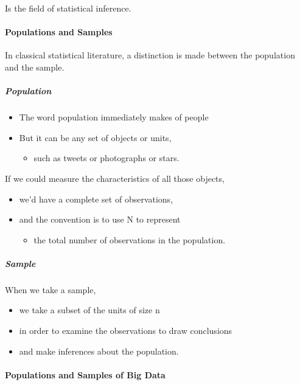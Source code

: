 \documentclass[]{article}
\providecommand{\tightlist}{%
  \setlength{\itemsep}{0pt}\setlength{\parskip}{0pt}}
\let\oldparagraph\paragraph
\renewcommand{\paragraph}[1]{\oldparagraph{#1}\mbox{}}
\let\oldsubparagraph\subparagraph
\renewcommand{\subparagraph}[1]{\oldsubparagraph{#1}\mbox{}}
\begin{document}
Is the field of statistical inference.

\paragraph{Populations and Samples}\label{populations-and-samples}

In classical statistical literature, a distinction is made between the
population and the sample.

\subparagraph{Population}\label{population}

\begin{itemize}
\tightlist
\item
  The word population immediately makes of people
\item
  But it can be any set of objects or units,

  \begin{itemize}
  \tightlist
  \item
    such as tweets or photographs or stars.
  \end{itemize}
\end{itemize}

If we could measure the characteristics of all those objects,

\begin{itemize}
\tightlist
\item
  we'd have a complete set of observations,
\item
  and the convention is to use N to represent

  \begin{itemize}
  \tightlist
  \item
    the total number of observations in the population.
  \end{itemize}
\end{itemize}

\subparagraph{Sample}\label{sample}

When we take a sample,

\begin{itemize}
\tightlist
\item
  we take a subset of the units of size n
\item
  in order to examine the observations to draw conclusions
\item
  and make inferences about the population.
\end{itemize}

\paragraph{Populations and Samples of Big
Data}\label{populations-and-samples-of-big-data}
\end{document}
